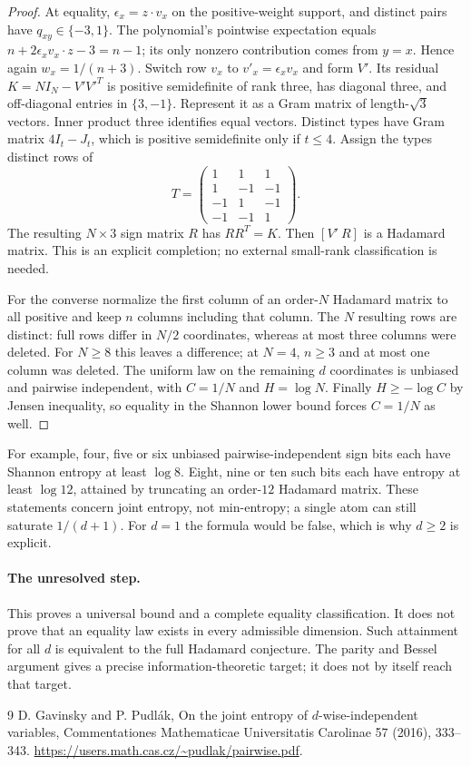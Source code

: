\begin{proof}
At equality, $\epsilon_x=z\cdot v_x$ on the positive-weight support,
and distinct pairs have $q_{xy}\in\{-3,1\}$. The polynomial's
pointwise expectation equals
$n+2\epsilon_xv_x\cdot z-3=n-1$; its only nonzero contribution
comes from $y=x$. Hence again $w_x=1/(n+3)$.
Switch row $v_x$ to $v'_x=\epsilon_xv_x$ and form $V'$.
Its residual $K=NI_N-V'V'^T$ is positive semidefinite of rank three,
has diagonal three, and off-diagonal entries in $\{3,-1\}$.
Represent it as a Gram matrix of length-$\sqrt3$ vectors. Inner
product three identifies equal vectors. Distinct types have Gram
matrix $4I_t-J_t$, which is positive semidefinite only if $t\le4$.
Assign the types distinct rows of
\[
 T=\begin{pmatrix}1&1&1\\1&-1&-1\\-1&1&-1\\-1&-1&1\end{pmatrix}.
\]
The resulting $N\times3$ sign matrix $R$ has $RR^T=K$.
Then $[V'\ R]$ is a Hadamard matrix. This is an explicit completion;
no external small-rank classification is needed.

For the converse normalize the first column of an order-$N$ Hadamard
matrix to all positive and keep $n$ columns including that column.
The $N$ resulting rows are distinct: full rows differ in $N/2$
coordinates, whereas at most three columns were deleted. For $N\ge8$
this leaves a difference; at $N=4$, $n\ge3$ and at most one column
was deleted. The uniform law on the remaining $d$ coordinates is
unbiased and pairwise independent, with $C=1/N$ and $H=\log N$.
Finally $H\ge-\log C$ by Jensen inequality, so equality in the Shannon
lower bound forces $C=1/N$ as well.
\end{proof}

For example, four, five or six unbiased pairwise-independent sign bits
each have Shannon entropy at least $\log8$. Eight, nine or ten such
bits each have entropy at least $\log12$, attained by truncating an
order-$12$ Hadamard matrix. These statements concern joint entropy,
not min-entropy; a single atom can still saturate $1/(d+1)$.
For $d=1$ the formula would be false, which is why $d\ge2$ is explicit.

\paragraph{The unresolved step.}
This proves a universal bound and a complete equality classification.
It does not prove that an equality law exists in every admissible
dimension. Such attainment for all $d$ is equivalent to the full
Hadamard conjecture. The parity and Bessel argument gives a precise
information-theoretic target; it does not by itself reach that target.

\begin{thebibliography}{9}
 D. Gavinsky and P. Pudl\'ak,
On the joint entropy of $d$-wise-independent variables,
Commentationes Mathematicae Universitatis Carolinae 57 (2016), 333--343.
\url{https://users.math.cas.cz/~pudlak/pairwise.pdf}.
\end{thebibliography}

